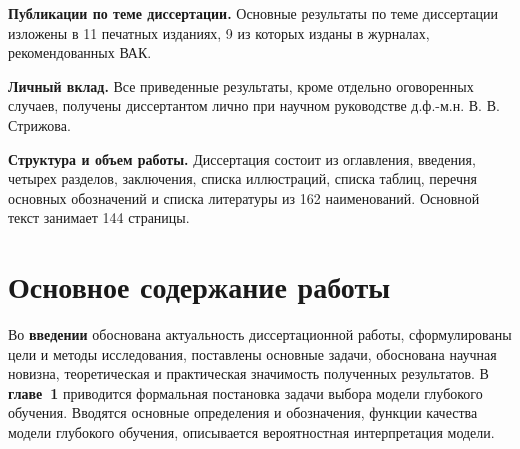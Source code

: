 \documentclass[11pt, a5paper]{dissert}
\theoremstyle{definition}
\begin{document}

\vspace{0.5cm}
\textbf{Публикации по теме диссертации.} Основные результаты по теме диссертации изложены в 11 печатных изданиях, 9 из которых изданы в журналах, рекомендованных ВАК.


\vspace{0.5cm}
\textbf{Личный вклад.} Все приведенные результаты, кроме отдельно оговоренных случаев, получены диссертантом лично при научном руководстве д.ф.-м.н. В. В. Стрижова.


\vspace{0.5cm}
\textbf{Структура и объем работы.} Диссертация состоит из оглавления, введения, четырех разделов, заключения, списка иллюстраций, списка таблиц, перечня основных обозначений и списка литературы из 162 наименований. Основной текст занимает 144 страницы.
\section*{Основное содержание работы}
Во \textbf{введении} обоснована актуальность диссертационной работы, сформулированы цели и методы исследования, поставлены основные задачи, обоснована научная новизна, теоретическая и практическая значимость полученных результатов.
В \textbf{главе~1} приводится формальная постановка задачи выбора модели глубокого обучения. Вводятся основные определения и обозначения, функции качества модели глубокого обучения, описывается вероятностная интерпретация модели.
\end{document}
